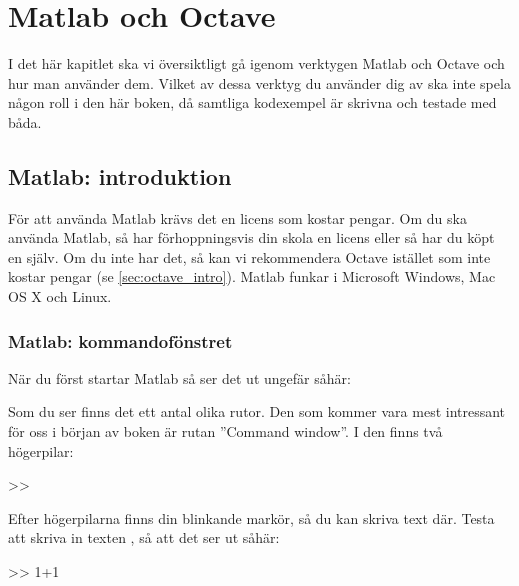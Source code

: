 %
%

\chapter{Matlab och Octave}\label{ch:installation}
I det här kapitlet ska vi översiktligt gå igenom verktygen Matlab och Octave och hur man använder dem. Vilket av dessa verktyg du använder dig av ska inte spela någon roll i den här boken, då samtliga kodexempel är skrivna och testade med båda.
\newpage
\section{Matlab: introduktion}
För att använda Matlab krävs det en licens som kostar pengar. Om du ska använda Matlab, så har förhoppningsvis din skola en licens eller så har du köpt en själv. Om du inte har det, så kan vi rekommendera Octave istället som inte kostar pengar (se \autoref{sec:octave_intro}). Matlab funkar i Microsoft Windows, Mac OS X och Linux.

\subsection{Matlab: kommandofönstret}
När du först startar Matlab så ser det ut ungefär såhär:


Som du ser finns det ett antal olika rutor. Den som kommer vara mest intressant för oss i början av boken är rutan ''Command window''. I den finns två högerpilar:

\begin{matlab}[caption={Tom kommando-rad},label={}]
>>
\end{matlab}

Efter högerpilarna finns din blinkande markör, så du kan skriva text där. Testa att skriva in texten , så att det ser ut såhär:

\begin{matlab}[caption={Skrivit in lite matte},label={}]
>> 1+1
\end{matlab}

